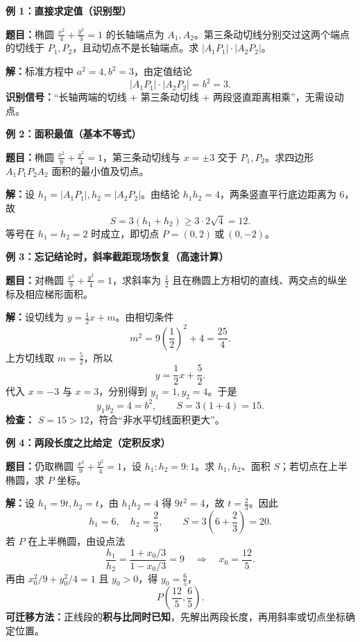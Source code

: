 \begin{examplebox}
\textbf{\textcolor{CExample}{例 1：直接求定值（识别型）}}

\textbf{题目：}椭圆 $\frac{x^2}{4}+\frac{y^2}{3}=1$ 的长轴端点为 $A_1,A_2$。第三条动切线分别交过这两个端点的切线于 $P_1,P_2$，且动切点不是长轴端点。求 $|A_1P_1|\cdot|A_2P_2|$。

\textbf{解：}标准方程中 $a^2=4,b^2=3$，由定值结论
\[
\boxed{|A_1P_1|\cdot|A_2P_2|=b^2=3}.
\]
\textbf{识别信号：}“长轴两端的切线 + 第三条动切线 + 两段竖直距离相乘”，无需设动点。

\medskip
\textbf{\textcolor{CExample}{例 2：面积最值（基本不等式）}}

\textbf{题目：}椭圆 $\frac{x^2}{9}+\frac{y^2}{4}=1$，第三条动切线与 $x=\pm3$ 交于 $P_1,P_2$。求四边形 $A_1P_1P_2A_2$ 面积的最小值及切点。

\textbf{解：}设 $h_1=|A_1P_1|,h_2=|A_2P_2|$。由结论 $h_1h_2=4$，两条竖直平行底边距离为 $6$，故
\[
S=3(h_1+h_2)\ge3\cdot2\sqrt{4}=\boxed{12}.
\]
等号在 $h_1=h_2=2$ 时成立，即切点 $\boxed{P=(0,2)\ \text{或}\ (0,-2)}$。

\medskip
\textbf{\textcolor{CExample}{例 3：忘记结论时，斜率截距现场恢复（高速计算）}}

\textbf{题目：}对椭圆 $\frac{x^2}{9}+\frac{y^2}{4}=1$，求斜率为 $\frac12$ 且在椭圆上方相切的直线、两交点的纵坐标及相应梯形面积。

\textbf{解：}设切线为 $y=\frac12x+m$。由相切条件
\[
m^2=9\left(\frac12\right)^2+4=\frac{25}{4}.
\]
上方切线取 $m=\frac52$，所以
\[
\boxed{y=\frac12x+\frac52}.
\]
代入 $x=-3$ 与 $x=3$，分别得到 $y_1=1,y_2=4$。于是
\[
y_1y_2=4=b^2,\qquad
S=3(1+4)=\boxed{15}.
\]
\textbf{检查：} $S=15>12$，符合“非水平切线面积更大”。

\medskip
\textbf{\textcolor{CExample}{例 4：两段长度之比给定（定积反求）}}

\textbf{题目：}仍取椭圆 $\frac{x^2}{9}+\frac{y^2}{4}=1$，设 $h_1:h_2=9:1$。求 $h_1,h_2$、面积 $S$；若切点在上半椭圆，求 $P$ 坐标。

\textbf{解：}设 $h_1=9t,h_2=t$，由 $h_1h_2=4$ 得 $9t^2=4$，故 $t=\frac23$。因此
\[
\boxed{h_1=6,\quad h_2=\frac23},\qquad
\boxed{S=3\left(6+\frac23\right)=20}.
\]
若 $P$ 在上半椭圆，由设点法
\[
\frac{h_1}{h_2}=\frac{1+x_0/3}{1-x_0/3}=9
\quad\Longrightarrow\quad x_0=\frac{12}{5}.
\]
再由 $x_0^2/9+y_0^2/4=1$ 且 $y_0>0$，得 $y_0=\frac65$，
\[
\boxed{P\left(\frac{12}{5},\frac65\right)}.
\]
\textbf{可迁移方法：}正线段的\textbf{积与比同时已知}，先解出两段长度，再用斜率或切点坐标确定位置。


\end{examplebox}

